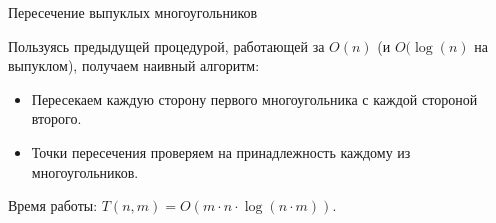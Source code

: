 \documentclass[12pt,aspectratio=169,svgnames]{beamer}
\begin{document}
    \begin{frame}{Пересечение выпуклых многоугольников}

        Пользуясь предыдущей процедурой, работающей за $O(n)$ (и $O(\log(n)$ на выпуклом), получаем наивный алгоритм:

        \begin{itemize}

            \item Пересекаем каждую сторону первого многоугольника с каждой стороной второго.

            \item Точки пересечения  проверяем на принадлежность каждому из многоугольников.

        \end{itemize}

        Время работы: $T(n, m) = O(m \cdot n \cdot \log(n \cdot m))$.

    \end{frame}
\end{document}
